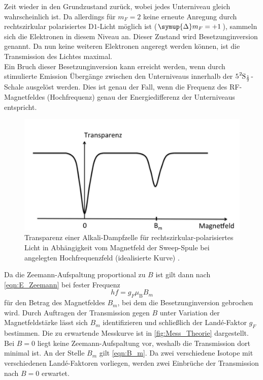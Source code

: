 Zeit wieder in den Grundzustand zurück, wobei jedes Unterniveau gleich wahrscheinlich ist. Da allerdings für $m_F = 2$ keine erneute Anregung durch rechtszirkular
polarisiertes $\text{D}1$-Licht möglich ist ($\symup{\Delta}m_F = +1$), sammeln sich die Elektronen in diesem Niveau an. Dieser Zustand wird Besetzunginversion genannt.
Da nun keine weiteren Elektronen angeregt werden können, ist die Transmission des Lichtes maximal. \\
Ein Bruch dieser Besetzunginversion kann erreicht werden, wenn durch stimulierte Emission Übergänge zwischen den Unterniveaus innerhalb der 
$5\ce{^{2}\text{S}_{\frac{1}{2}}}$-Schale ausgelöst werden. Dies ist genau der Fall, wenn die Frequenz des RF-Magnetfeldes (Hochfrequenz) genau der 
Energiedifferenz der Unterniveaus entspricht. 
\begin{figure}
    \centering
    \includegraphics[width = .75\textwidth]{"content/pics/Messkurve_Theorie.png"}
    \caption{Transparenz einer Alkali-Dampfzelle für rechtszirkular-polarisiertes Licht in
    Abhängigkeit vom Magnetfeld der Sweep-Spule bei angelegten Hochfrequenzfeld
    (idealisierte Kurve) \cite{v21old}.}
    \label{fig:Mess_Theorie}
\end{figure}
Da die Zeemann-Aufspaltung proportional zu $B$ ist gilt dann nach \autoref{eqn:E_Zeemann} bei fester Frequenz
\begin{equation}
    \label{eqn:B_m}
    hf = g_F \mu_\text{B} B_m
\end{equation}
für den Betrag des Magnetfeldes $B_m$, bei dem die Besetzunginversion gebrochen wird.
Durch Auftragen der Transmission gegen $B$ unter Variation der Magnetfeldstärke lässt sich $B_m$ identifizieren und schließlich der Landé-Faktor $g_F$ bestimmen.
Die zu erwartende Messkurve ist in \autoref{fig:Mess_Theorie} dargestellt. Bei $B=0$ liegt keine Zeemann-Aufspaltung vor, weshalb die Transmission dort minimal ist.
An der Stelle $B_m$ gilt \autoref{eqn:B_m}. Da zwei verschiedene Isotope mit verschiedenen Landé-Faktoren vorliegen, werden zwei Einbrüche der Transmission nach 
$B = 0$ erwartet.

